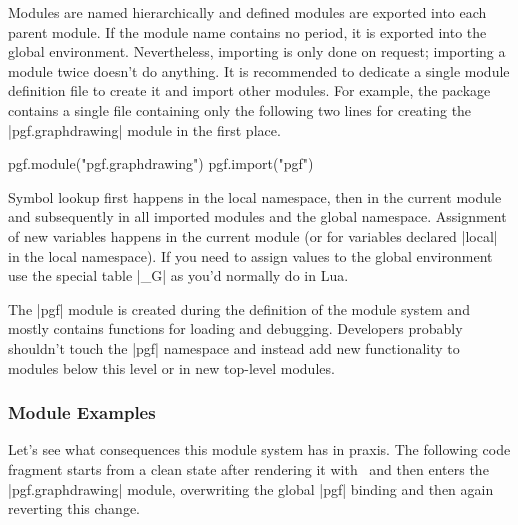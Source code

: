 Modules are named hierarchically and defined modules are exported into
each parent module.  If the module name contains no period, it is
exported into the global environment.  Nevertheless, importing is only
done on request; importing a module twice doesn't do anything.
It is recommended to dedicate a single module definition file
to create it and import other modules.  For example, the package
contains a single file containing only the following two lines for
creating the |pgf.graphdrawing| module in the first place.

\begin{codeexample}
pgf.module("pgf.graphdrawing")
pgf.import("pgf")
\end{codeexample}

Symbol lookup first happens in the local namespace, then in the
current module and subsequently in all imported modules and the global
namespace.  Assignment of new variables happens in the current module
(or for variables declared |local| in the local namespace).  If you
need to assign values to the global environment use the special table
|_G| as you'd normally do in Lua.

The |pgf| module is created during the definition of the module system
and mostly contains functions for loading and debugging.  Developers
probably shouldn't touch the |pgf| namespace and instead add new
functionality to modules below this level or in new top-level
modules.

\subsubsection{Module Examples}
Let's see what consequences this module system has in praxis.  The
following code fragment starts from a clean state after rendering it
with \LuaTeX\ and then enters the |pgf.graphdrawing| module,
overwriting the global |pgf| binding and then again reverting this
change.

\begin{codeexample}
  

  \usetikzlibrary{graphdrawing}

\end{codeexample}

